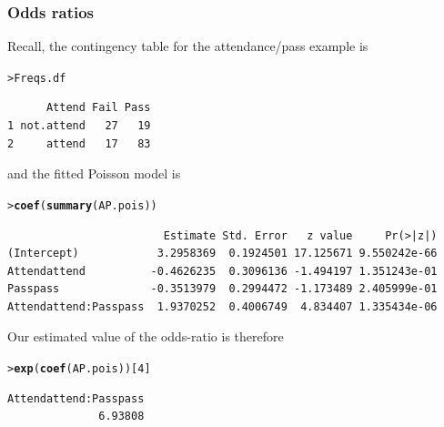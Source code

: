 \documentclass{beamer}\usepackage[]{graphicx}\usepackage[]{xcolor}
\makeatletter
\newcommand{\hlnum}[1]{\textcolor[rgb]{0.686,0.059,0.569}{#1}}%
\newcommand{\hlstd}[1]{\textcolor[rgb]{0.345,0.345,0.345}{#1}}%
\newcommand{\hlkwd}[1]{\textcolor[rgb]{0.737,0.353,0.396}{\textbf{#1}}}%
\newenvironment{kframe}{%
 \def\at@end@of@kframe{}%
 \ifinner\ifhmode%
  \def\at@end@of@kframe{\end{minipage}}%
  \begin{minipage}{\columnwidth}%
 \fi\fi%
 \def\FrameCommand##1{\hskip\@totalleftmargin \hskip-\fboxsep
 \colorbox{shadecolor}{##1}\hskip-\fboxsep
     \hskip-\linewidth \hskip-\@totalleftmargin \hskip\columnwidth}%
 \MakeFramed {\advance\hsize-\width
   \@totalleftmargin\z@ \linewidth\hsize
   \@setminipage}}%
 {\par\unskip\endMakeFramed%
 \at@end@of@kframe}
\newenvironment{knitrout}{}{} %
\makeatother
\begin{document}
\begin{frame}[fragile]
\frametitle{Odds ratios}
Recall, the contingency table for the attendance/pass example is

\begin{knitrout}\scriptsize
{}\color{fgcolor}\begin{kframe}
\begin{alltt}
\hlstd{> }\hlstd{Freqs.df}
\end{alltt}
\begin{verbatim}
      Attend Fail Pass
1 not.attend   27   19
2     attend   17   83
\end{verbatim}
\end{kframe}
\end{knitrout}
\medskip

and the fitted Poisson model is
\begin{knitrout}\scriptsize
{}\color{fgcolor}\begin{kframe}
\begin{alltt}
\hlstd{> }\hlkwd{coef}\hlstd{(}\hlkwd{summary}\hlstd{(AP.pois))}
\end{alltt}
\begin{verbatim}
                        Estimate Std. Error   z value     Pr(>|z|)
(Intercept)            3.2958369  0.1924501 17.125671 9.550242e-66
Attendattend          -0.4626235  0.3096136 -1.494197 1.351243e-01
Passpass              -0.3513979  0.2994472 -1.173489 2.405999e-01
Attendattend:Passpass  1.9370252  0.4006749  4.834407 1.335434e-06
\end{verbatim}
\end{kframe}
\end{knitrout}
\medskip
Our estimated value of the odds-ratio is therefore

\begin{knitrout}\scriptsize
{}\color{fgcolor}\begin{kframe}
\begin{alltt}
\hlstd{> }\hlkwd{exp}\hlstd{(}\hlkwd{coef}\hlstd{(AP.pois))[}\hlnum{4}\hlstd{]}
\end{alltt}
\begin{verbatim}
Attendattend:Passpass 
              6.93808 
\end{verbatim}
\end{kframe}
\end{knitrout}
\end{frame}
\end{document}
